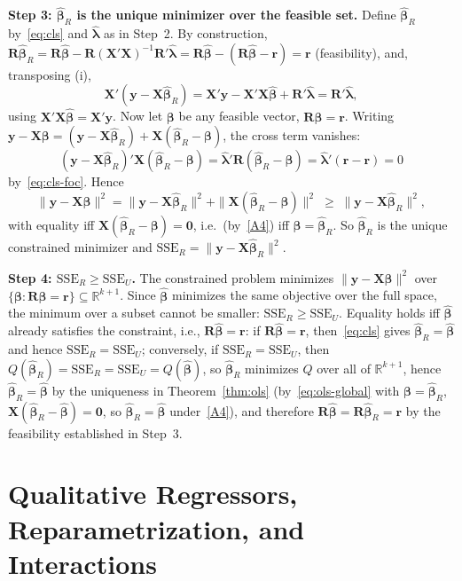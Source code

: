 \documentclass[12pt,a4paper]{article}
\makeatletter
\theoremstyle{definition}
\renewenvironment{proof}[1][\proofname]{\par
  \pushQED{\qed}%
  \normalfont \topsep6\p@\@plus6\p@\relax
  \trivlist
  \item[\hskip\labelsep\bfseries #1\@addpunct{.}]\ignorespaces
}{%
  \popQED\endtrivlist\@endpefalse
}
\newcommand{\SSE}{\mathrm{SSE}}
\newcommand{\bX}{\mathbf{X}}
\newcommand{\by}{\mathbf{y}}
\def\bb{\boldsymbol{\beta}}
\newcommand{\bR}{\mathbf{R}}
\newcommand{\br}{\mathbf{r}}
\newcommand{\bzero}{\mathbf{0}}
\newcommand{\Real}{\mathbb{R}}
\makeatother
\begin{document}
\begin{proof}
\textbf{Step 3: $\hat{\bb}_R$ is the unique minimizer over the feasible set.} Define $\hat{\bb}_R$ by~\eqref{eq:cls} and $\hat{\boldsymbol\lambda}$ as in Step~2. By construction, $\bR\hat{\bb}_R = \bR\hat{\bb} - \bR(\bX'\bX)^{-1}\bR'\hat{\boldsymbol\lambda} = \bR\hat{\bb} - (\bR\hat{\bb} - \br) = \br$ (feasibility), and, transposing (i),
\begin{equation}\label{eq:cls-foc}
\bX'(\by - \bX\hat{\bb}_R) = \bX'\by - \bX'\bX\hat{\bb} + \bR'\hat{\boldsymbol\lambda} = \bR'\hat{\boldsymbol\lambda},
\end{equation}
using $\bX'\bX\hat{\bb} = \bX'\by$. Now let $\bb$ be any feasible vector, $\bR\bb = \br$. Writing $\by - \bX\bb = (\by - \bX\hat{\bb}_R) + \bX(\hat{\bb}_R - \bb)$, the cross term vanishes:
\[
(\by - \bX\hat{\bb}_R)'\bX(\hat{\bb}_R - \bb) = \hat{\boldsymbol\lambda}'\bR(\hat{\bb}_R - \bb) = \hat{\boldsymbol\lambda}'(\br - \br) = 0
\]
by~\eqref{eq:cls-foc}. Hence
\[
\|\by - \bX\bb\|^2 = \|\by - \bX\hat{\bb}_R\|^2 + \|\bX(\hat{\bb}_R - \bb)\|^2 \;\geqslant\; \|\by - \bX\hat{\bb}_R\|^2,
\]
with equality iff $\bX(\hat{\bb}_R - \bb) = \bzero$, i.e.\ (by~\ref{A4}) iff $\bb = \hat{\bb}_R$. So $\hat{\bb}_R$ is the unique constrained minimizer and $\SSE_R = \|\by - \bX\hat{\bb}_R\|^2$.

\textbf{Step 4: $\SSE_R \geqslant \SSE_U$.} The constrained problem minimizes $\|\by - \bX\bb\|^2$ over $\{\bb : \bR\bb = \br\} \subseteq \Real^{k+1}$. Since $\hat{\bb}$ minimizes the same objective over the full space, the minimum over a subset cannot be smaller: $\SSE_R \geqslant \SSE_U$. Equality holds iff $\hat{\bb}$ already satisfies the constraint, i.e., $\bR\hat{\bb} = \br$: if $\bR\hat{\bb} = \br$, then~\eqref{eq:cls} gives $\hat{\bb}_R = \hat{\bb}$ and hence $\SSE_R = \SSE_U$; conversely, if $\SSE_R = \SSE_U$, then $Q(\hat{\bb}_R) = \SSE_R = \SSE_U = Q(\hat{\bb})$, so $\hat{\bb}_R$ minimizes $Q$ over all of $\Real^{k+1}$, hence $\hat{\bb}_R = \hat{\bb}$ by the uniqueness in Theorem~\ref{thm:ols} (by~\eqref{eq:ols-global} with $\bb = \hat{\bb}_R$, $\bX(\hat{\bb}_R - \hat{\bb}) = \bzero$, so $\hat{\bb}_R = \hat{\bb}$ under~\ref{A4}), and therefore $\bR\hat{\bb} = \bR\hat{\bb}_R = \br$ by the feasibility established in Step~3.
\end{proof}

\section{Qualitative Regressors, Reparametrization, and Interactions}\label{sec:qual}
\end{document}

